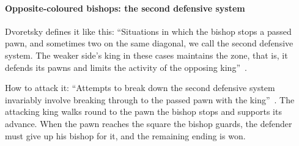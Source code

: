 
\paragraph{Opposite-coloured bishops: the second defensive system}\label{second-defence-system}
Dvoretsky defines it like this: ``Situations in which the bishop stops a passed pawn, and sometimes
two on the same diagonal, we call the second defensive system. The weaker side's king in these
cases maintains the zone, that is, it defends its pawns and limits the activity of the opposing
king''~\cite{Dvoretsky:2008-endgame-manual}.

How to attack it: ``Attempts to break down the second defensive system invariably involve breaking
through to the passed pawn with the king''~\cite{Dvoretsky:2008-endgame-manual}. The attacking king
walks round to the pawn the bishop stops and supports its advance.
When the pawn reaches the square the bishop guards, the defender must give up his bishop for it,
and the remaining ending is won.

